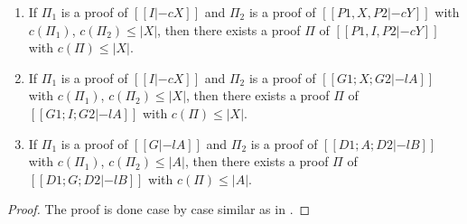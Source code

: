 \begin{lemma}
  \label{lem:cut-reduction}
  \begin{enumerate}
  \item If $\Pi_1$ is a proof of $[[I |-c X]]$ and $\Pi_2$ is a proof of
  $[[P1,X,P2 |-c Y]]$ with $c(\Pi_1)$, $c(\Pi_2)\leq |X|$, then there exists
  a proof $\Pi$ of $[[P1, I, P2 |-c Y]]$ with $c(\Pi)\leq |X|$.
  \item If $\Pi_1$ is a proof of $[[I |-c X]]$ and $\Pi_2$ is a proof of
  $[[G1; X; G2 |-l A]]$ with $c(\Pi_1)$, $c(\Pi_2)\leq |X|$, then there
  exists a proof $\Pi$ of $[[G1; I; G2 |-l A]]$ with $c(\Pi)\leq |X|$.
  \item If $\Pi_1$ is a proof of $[[G |-l A]]$ and $\Pi_2$ is a proof of
  $[[D1; A; D2 |-l B]]$ with $c(\Pi_1)$, $c(\Pi_2)\leq |A|$, then there
  exists a proof $\Pi$ of $[[D1; G; D2 |-l B]]$ with $c(\Pi)\leq |A|$.
  \end{enumerate}
\end{lemma}
\begin{proof}
  The proof is done case by case similar as in \cite{Mellies:2009}.
\end{proof}

